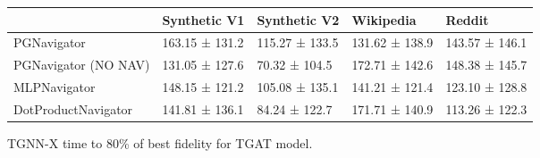 \begin{tabular}{lllll}
\toprule
 & Synthetic V1 & Synthetic V2 & Wikipedia & Reddit \\
\midrule
PGNavigator & 163.15 ± 131.2 & 115.27 ± 133.5 & 131.62 ± 138.9 & 143.57 ± 146.1 \\
PGNavigator (NO NAV) & 131.05 ± 127.6 & 70.32 ± 104.5 & 172.71 ± 142.6 & 148.38 ± 145.7 \\
MLPNavigator & 148.15 ± 121.2 & 105.08 ± 135.1 & 141.21 ± 121.4 & 123.10 ± 128.8 \\
DotProductNavigator & 141.81 ± 136.1 & 84.24 ± 122.7 & 171.71 ± 140.9 & 113.26 ± 122.3 \\
\bottomrule
\end{tabular}
\caption{\label{tab:tgat_time}TGNN-X time to 80\% of best fidelity for TGAT model.}

